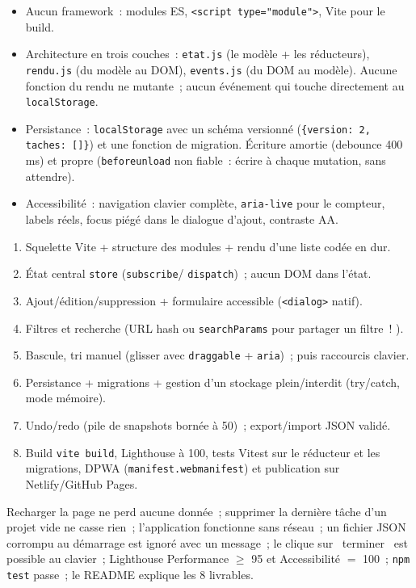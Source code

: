\begin{itemize}
  \item Aucun framework~: modules ES, \verb|<script type="module">|, Vite pour le build.
  \item Architecture en trois couches~: \verb|etat.js| (le mod\`ele + les r\'educteurs),
        \verb|rendu.js| (du mod\`ele au DOM), \verb|events.js| (du DOM au mod\`ele). Aucune fonction
        du rendu ne mutante~; aucun \'ev\'enement qui touche directement au \verb|localStorage|.
  \item Persistance~: \verb|localStorage| avec un sch\'ema versionn\'e (\verb|{version: 2, taches: []}|)
        et une fonction de migration. \'Ecriture amortie (debounce 400 ms) et propre
        (\verb|beforeunload| non fiable~: \'ecrire \`a chaque mutation, sans attendre).
  \item Accessibilit\'e~: navigation clavier compl\`ete, \verb|aria-live| pour le compteur, labels
        r\'eels, focus pi\'eg\'e dans le dialogue d'ajout, contraste AA.
\end{itemize}

\begin{enumerate}
  \item Squelette Vite + structure des modules + rendu d'une liste cod\'ee en dur.
  \item \'Etat central \verb|store| (\verb|subscribe|/ \verb|dispatch|)~; aucun DOM dans l'\'etat.
  \item Ajout/\'edition/suppression + formulaire accessible (\verb|<dialog>| natif).
  \item Filtres et recherche (URL hash ou \verb|searchParams| pour partager un filtre~! ).
  \item Bascule, tri manuel (glisser avec \verb|draggable| + \verb|aria|)~; puis raccourcis clavier.
  \item Persistance + migrations + gestion d'un stockage plein/interdit (try/catch, mode m\'emoire).
  \item Undo/redo (pile de snapshots born\'ee \`a 50)~; export/import JSON valid\'e.
  \item Build \verb|vite build|, Lighthouse \`a 100, tests Vitest sur le r\'educteur et les migrations,
        DPWA (\verb|manifest.webmanifest|) et publication sur Netlify/GitHub Pages.
\end{enumerate}

Recharger la page ne perd aucune donn\'ee~; supprimer la derni\`ere t\^ache d'un projet vide ne casse
rien~; l'application fonctionne sans r\'eseau~; un fichier JSON corrompu au d\'emarrage est ignor\'e
avec un message~; le clique sur \og ~terminer~ \fg{} est possible au clavier~; Lighthouse Performance
$\geq$ 95 et Accessibilit\'e $=$ 100~; \verb|npm test| passe~; le README explique les 8 livrables.

